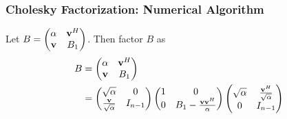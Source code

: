 \documentclass{beamer}
\begin{document}
\begin{frame}\frametitle{Cholesky Factorization: Numerical Algorithm}
	Let $B = \begin{pmatrix}
		\alpha & \mathbf{v}^H \\
		\mathbf{v} & B_1
	\end{pmatrix}$. 
	Then factor $B$ as
	\begin{align*}
		B &= \begin{pmatrix}
			\alpha & \mathbf{v}^H\\
			\mathbf{v} & B_1
			\end{pmatrix} \\
		&=
			\begin{pmatrix}
				\sqrt{\alpha} & 0\\
				\frac{\mathbf{v}}{\sqrt{\alpha}} & I_{n-1}
			\end{pmatrix}
			\begin{pmatrix}
				1 & 0\\
				0 & B_1-\frac{\mathbf{v}\mathbf{v}^H}{\alpha}
			\end{pmatrix}
			\begin{pmatrix}
				\sqrt{\alpha} & \frac{\mathbf{v}^H}{\sqrt{\alpha}}\\
				0 & I_{n-1}
			\end{pmatrix}\\
	\end{align*}
	
\end{frame}
\end{document}
